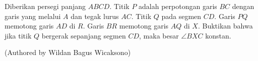 Diberikan persegi panjang $ABCD$. Titik $P$ adalah perpotongan garis $BC$ dengan garis yang melalui $A$ dan tegak lurus $AC$. Titik $Q$ pada segmen $CD$. Garis $PQ$ memotong garis $AD$ di $R$. Garis $BR$ memotong garis $AQ$ di $X$. Buktikan bahwa jika titik $Q$ bergerak sepanjang segmen $CD$, maka besar $\angle BXC$ konstan.

(Authored by Wildan Bagus Wicaksono)